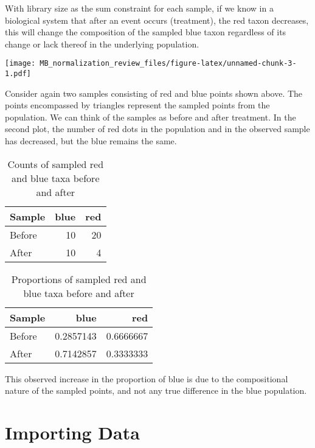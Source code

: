 \documentclass[
]{book}
\begin{document}
With library size as the sum constraint for each sample, if we know in a biological system that after an event occurs (treatment), the red taxon decreases, this will change the composition of the sampled blue taxon regardless of its change or lack thereof in the underlying population.

\texttt{[image: MB\_normalization\_review\_files/figure-latex/unnamed-chunk-3-1.pdf]}

Consider again two samples consisting of red and blue points shown above. The points encompassed by triangles represent the sampled points from the population. We can think of the samples as before and after treatment. In the second plot, the number of red dots in the population and in the observed sample has decreased, but the blue remains the same.

\begin{table}

\caption{\label{tab:unnamed-chunk-4}Counts of sampled red and blue taxa before and after}
\centering
\begin{tabular}[t]{l|r|r}
\hline
Sample & blue & red\\
\hline
Before & 10 & 20\\
\hline
After & 10 & 4\\
\hline
\end{tabular}
\end{table}

\begin{table}

\caption{\label{tab:unnamed-chunk-4}Proportions of sampled red and blue taxa before and after}
\centering
\begin{tabular}[t]{l|r|r}
\hline
Sample & blue & red\\
\hline
Before & 0.2857143 & 0.6666667\\
\hline
After & 0.7142857 & 0.3333333\\
\hline
\end{tabular}
\end{table}

This observed increase in the proportion of blue is due to the compositional nature of the sampled points, and not any true difference in the blue population.

\hypertarget{importing-data}{%
\chapter{Importing Data}\label{importing-data}}
\end{document}
